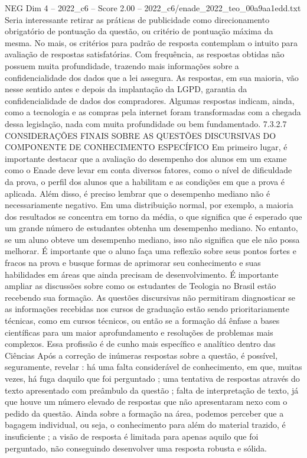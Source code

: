 \begin{textsample}{NEG Dim 4 – 2022\_c6 – Score 2.00 – 2022\_c6/enade\_2022\_teo\_00a9aa1edd.txt}
Seria interessante retirar as práticas de publicidade como direcionamento obrigatório de pontuação da questão, ou critério de pontuação máxima da mesma.
No mais, os critérios para padrão de resposta contemplam o intuito para avaliação de respostas satisfatórias.
Com frequência, as respostas obtidas não possuem muita profundidade, trazendo mais informações sobre a confidencialidade dos dados que a lei assegura.
As respostas, em sua maioria, vão nesse sentido antes e depois da implantação da LGPD, garantia da confidencialidade de dados dos compradores.
Algumas respostas indicam, ainda, como a tecnologia e as compras pela internet foram transformadas com a chegada dessa legislação, nada com muita profundidade ou bem fundamentado. 7.3.2.7 CONSIDERAÇÕES FINAIS SOBRE AS QUESTÕES DISCURSIVAS DO COMPONENTE DE CONHECIMENTO ESPECÍFICO Em primeiro lugar, é importante destacar que a avaliação do desempenho dos alunos em um exame como o Enade deve levar em conta diversos fatores, como o nível de dificuldade da prova, o perfil dos alunos que a habilitam e as condições em que a prova é aplicada.
Além disso, é preciso lembrar que o desempenho mediano não é necessariamente negativo.
Em uma distribuição normal, por exemplo, a maioria dos resultados se concentra em torno da média, o que significa que é esperado que um grande número de estudantes obtenha um desempenho mediano.
No entanto, se um aluno obteve um desempenho mediano, isso não significa que ele não possa melhorar.
É importante que o aluno faça uma reflexão sobre seus pontos fortes e fracos na prova e busque formas de aprimorar seu conhecimento e suas habilidades em áreas que ainda precisam de desenvolvimento.
É importante ampliar as discussões sobre como os estudantes de Teologia no Brasil estão recebendo sua formação.
As questões discursivas não permitiram diagnosticar se as informações recebidas nos cursos de graduação estão sendo prioritariamente técnicas, como em cursos técnicos, ou então se a formação dá ênfase a bases científicas para um maior aprofundamento e resoluções de problemas mais complexos.
Essa profissão é de cunho mais específico e analítico dentro das Ciências Após a correção de inúmeras respostas sobre a questão, é possível, seguramente, revelar : há uma falta considerável de conhecimento, em que, muitas vezes, há fuga daquilo que foi perguntado ; uma tentativa de respostas através do texto apresentado com preâmbulo da questão ; falta de interpretação de texto, já que houve um número elevado de respostas que não apresentaram nexo com o pedido da questão.
Ainda sobre a formação na área, podemos perceber que a bagagem individual, ou seja, o conhecimento para além do material trazido, é insuficiente ; a visão de resposta é limitada para apenas aquilo que foi perguntado, não conseguindo desenvolver uma resposta robusta e sólida.

\end{textsample}
